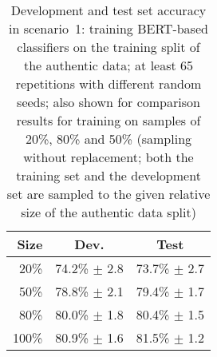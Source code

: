 
\begin{table}
\centering
\begin{tabular}{rcc}
\textbf{Size}  & \textbf{Dev.} & \textbf{Test}  \\
\hline
20\%  &   74.2\% $\pm$    2.8  &   73.7\% $\pm$    2.7  \\
50\%  &   78.8\% $\pm$    2.1  &   79.4\% $\pm$    1.7  \\
80\%  &   80.0\% $\pm$    1.8  &   80.4\% $\pm$    1.5  \\
100\%  &   80.9\% $\pm$    1.6  &   81.5\% $\pm$    1.2  \\
\hline
\end{tabular}
\caption{Development and test set accuracy in scenario~1: training BERT-based classifiers on the training split of the
authentic data;
at least
65 repetitions with different random seeds;
also shown for comparison results for training on samples
of 20\%, 80\% and 50\%
(sampling without replacement;
both the training set and the development set are sampled
to the given relative size of the authentic data split)
}
\label{t:results-s1-b}
\end{table}
